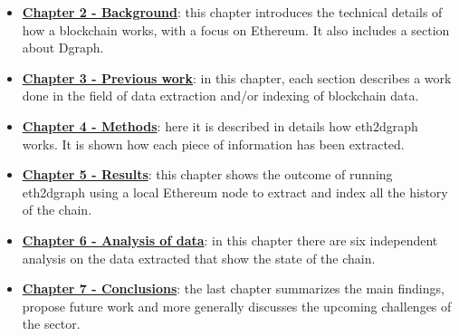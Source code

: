 \begin{itemize}
    \item \hyperref[chapter-2]{\textbf{Chapter 2 - Background}}: this chapter introduces the technical details of how a blockchain works, with a focus on Ethereum. It also includes a section about Dgraph. 
    \item \hyperref[chapter-3]{\textbf{Chapter 3 - Previous work}}: in this chapter, each section describes a work done in the field of data extraction and/or indexing of blockchain data.
    \item \hyperref[chapter-4]{\textbf{Chapter 4 - Methods}}: here it is described in details how eth2dgraph works. It is shown how each piece of information has been extracted.
    \item \hyperref[chapter-5]{\textbf{Chapter 5 - Results}}: this chapter shows the outcome of running eth2dgraph using a local Ethereum node to extract and index all the history of the chain.  
    \item \hyperref[chapter-6]{\textbf{Chapter 6 - Analysis of data}}: in this chapter there are six independent analysis on the data extracted that show the state of the chain.
    \item \hyperref[chapter-7]{\textbf{Chapter 7 - Conclusions}}: the last chapter summarizes the main findings, propose future work and more generally discusses the upcoming challenges of the sector.
\end{itemize}

